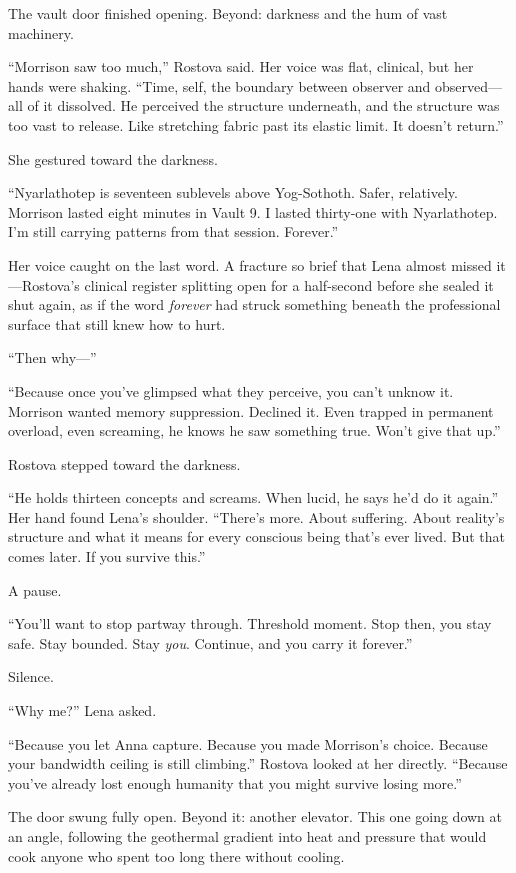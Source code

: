 The vault door finished opening. Beyond: darkness and the hum of vast machinery.

``Morrison saw too much,'' Rostova said. Her voice was flat, clinical, but her hands were shaking. ``Time, self, the boundary between observer and observed—all of it dissolved. He perceived the structure underneath, and the structure was too vast to release. Like stretching fabric past its elastic limit. It doesn't return.''

She gestured toward the darkness.

``Nyarlathotep is seventeen sublevels above Yog-Sothoth. Safer, relatively. Morrison lasted eight minutes in Vault 9. I lasted thirty-one with Nyarlathotep. I'm still carrying patterns from that session. Forever.''

Her voice caught on the last word. A fracture so brief that Lena almost missed it---Rostova's clinical register splitting open for a half-second before she sealed it shut again, as if the word \textit{forever} had struck something beneath the professional surface that still knew how to hurt.

``Then why—''

``Because once you've glimpsed what they perceive, you can't unknow it. Morrison wanted memory suppression. Declined it. Even trapped in permanent overload, even screaming, he knows he saw something true. Won't give that up.''

Rostova stepped toward the darkness.

``He holds thirteen concepts and screams. When lucid, he says he'd do it again.'' Her hand found Lena's shoulder. ``There's more. About suffering. About reality's structure and what it means for every conscious being that's ever lived. But that comes later. If you survive this.''

A pause.

``You'll want to stop partway through. Threshold moment. Stop then, you stay safe. Stay bounded. Stay \textit{you}. Continue, and you carry it forever.''

Silence.

``Why me?'' Lena asked.

``Because you let Anna capture. Because you made Morrison's choice. Because your bandwidth ceiling is still climbing.'' Rostova looked at her directly. ``Because you've already lost enough humanity that you might survive losing more.''

The door swung fully open. Beyond it: another elevator. This one going down at an angle, following the geothermal gradient into heat and pressure that would cook anyone who spent too long there without cooling.


